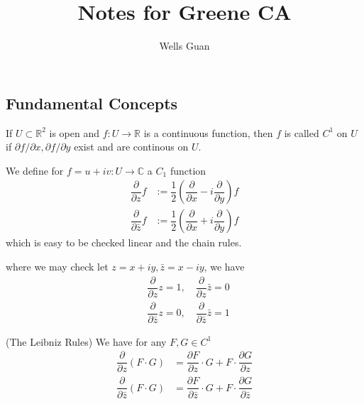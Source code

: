 \documentclass[lang=en, color=blue, ]{elegantbook}
\title{Notes for Greene CA}
\author{Wells Guan}
\newcommand{\R}{\mathbb{R}}
\newcommand{\C}{\mathbb{C}}
\begin{document}


\chapter{}
\section*{Fundamental Concepts}

\begin{definition}
If $U\subset \R^2$ is open and $f:U\to\R$ is a continuous function, then $f$ is called $C^1$ on $U$ if $\partial f/\partial x, \partial f/\partial y$ exist and are continous on $U$.
\end{definition}

\begin{definition}
    We define for $f = u+iv:U\to \C$ a $C_1$ function
    \[
    \begin{aligned}
    \dfrac{\partial}{\partial z}f &:=\dfrac{1}{2}(\dfrac{\partial}{\partial x} - i\dfrac{\partial}{\partial y})f \\
    \dfrac{\partial}{\partial \bar{z}}f &:=\dfrac{1}{2}(\dfrac{\partial}{\partial x} + i\dfrac{\partial}{\partial y})f
    \end{aligned}
    \]
    which is easy to be checked linear and the chain rules.
\end{definition}
where we may check let $z = x+iy, \bar{z} = x-iy$, we have
\[
\begin{aligned}
    &\dfrac{\partial}{\partial z} z = 1,\quad \dfrac{\partial}{\partial z}\bar{z} = 0 \\
    &\dfrac{\partial}{\partial \bar{z}} z = 0,\quad \dfrac{\partial}{\partial \bar{z}}\bar{z} = 1
\end{aligned}
\]

\begin{proposition}
(The Leibniz Rules) We have for any $F,G \in C^1$
\[
\begin{aligned}
\dfrac{\partial}{\partial z}(F\cdot G) &= \dfrac{\partial F}{\partial z}\cdot G + F\cdot \dfrac{\partial G}{\partial z} \\ 
\dfrac{\partial}{\partial \bar{z}}(F\cdot G) &= \dfrac{\partial F}{\partial \bar{z}}\cdot G + F\cdot \dfrac{\partial G}{\partial \bar{z}} \\ 
\end{aligned}
\]
\end{proposition}
\end{document}
